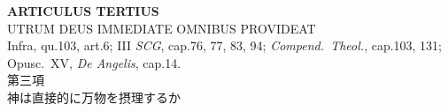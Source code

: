 \documentclass[paper=a4paper,fontsize=10pt,jafontsize=9pt,titlepage]{jlreq}
\begin{document}
\newpage
{}
{}
\setcounter{section}{3}
\setcounter{subsection}{0}



\begin{center}
 {\Large {\bfseries ARTICULUS TERTIUS}}\\
 {\large UTRUM DEUS IMMEDIATE OMNIBUS PROVIDEAT}\\
 {\footnotesize Infra, qu.103, art.6; III {\itshape SCG}, cap.76, 77,
 83, 94; {\itshape Compend.~Theol.}, cap.103, 131; Opusc.~XV, {\itshape
 De Angelis}, cap.14.}\\
 {\Large 第三項\\神は直接的に万物を摂理するか}
\end{center}
\end{document}
